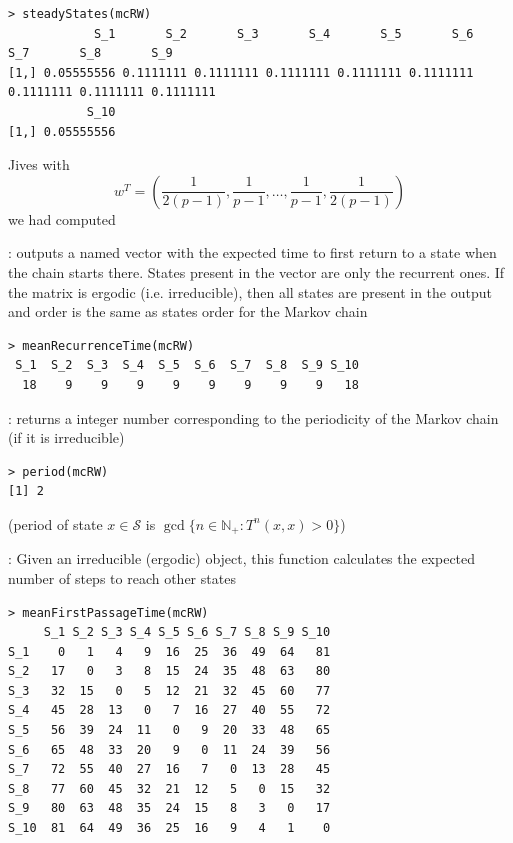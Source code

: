 \documentclass[aspectratio=169]{beamer}
\begin{document}
\begin{frame}[fragile]
\begin{lstlisting}
> steadyStates(mcRW)
            S_1       S_2       S_3       S_4       S_5       S_6       S_7       S_8       S_9
[1,] 0.05555556 0.1111111 0.1111111 0.1111111 0.1111111 0.1111111 0.1111111 0.1111111 0.1111111
           S_10
[1,] 0.05555556
\end{lstlisting}
\vfill
Jives with 
$$
w^T=\left(\frac{1}{2(p-1)},\frac{1}{p-1},\ldots,\frac{1}{p-1},\frac{1}{2(p-1)}\right)
$$
we had computed
\end{frame}

\begin{frame}[fragile]
: outputs a named vector with the expected time to first return to a state when the chain starts there. States present in the vector are only the recurrent ones. If the matrix is ergodic (i.e. irreducible), then all states are present in the output and order is the same as states order for the Markov chain
\begin{lstlisting}[language=Renhanced]
> meanRecurrenceTime(mcRW)
 S_1  S_2  S_3  S_4  S_5  S_6  S_7  S_8  S_9 S_10 
  18    9    9    9    9    9    9    9    9   18 
\end{lstlisting}
\vfill
{}: returns a integer number corresponding to the periodicity of the Markov chain (if it is irreducible)
\begin{lstlisting}[language=Renhanced]
> period(mcRW)
[1] 2
\end{lstlisting}
(period of state $x\in\mathcal{S}$ is $\gcd\{n\in\mathbb{N}_+: T^n(x,x)>0\}$)
\end{frame}

\begin{frame}[fragile]
: Given an irreducible (ergodic)  object, this function calculates the expected number of steps to reach other states

\begin{lstlisting}[language=Renhanced]
> meanFirstPassageTime(mcRW)
     S_1 S_2 S_3 S_4 S_5 S_6 S_7 S_8 S_9 S_10
S_1    0   1   4   9  16  25  36  49  64   81
S_2   17   0   3   8  15  24  35  48  63   80
S_3   32  15   0   5  12  21  32  45  60   77
S_4   45  28  13   0   7  16  27  40  55   72
S_5   56  39  24  11   0   9  20  33  48   65
S_6   65  48  33  20   9   0  11  24  39   56
S_7   72  55  40  27  16   7   0  13  28   45
S_8   77  60  45  32  21  12   5   0  15   32
S_9   80  63  48  35  24  15   8   3   0   17
S_10  81  64  49  36  25  16   9   4   1    0
\end{lstlisting}
\end{frame}
\end{document}
